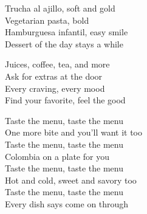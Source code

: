 \begin{lyrics}
Trucha al ajillo, soft and gold\\
Vegetarian pasta, bold\\
Hamburguesa infantil, easy smile\\
Dessert of the day stays a while

Juices, coffee, tea, and more\\
Ask for extras at the door\\
Every craving, every mood\\
Find your favorite, feel the good

Taste the menu, taste the menu\\
One more bite and you’ll want it too\\
Taste the menu, taste the menu\\
Colombia on a plate for you\\
Taste the menu, taste the menu\\
Hot and cold, sweet and savory too\\
Taste the menu, taste the menu\\
Every dish says come on through
\end{lyrics}

